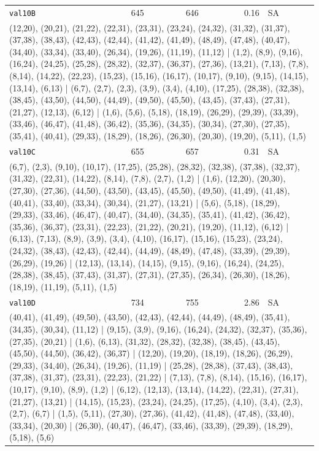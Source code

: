 \begin{longtable}{lrrrl}
\texttt{val10B} & 645 & 646 & 0.16 & SA \\
\multicolumn{5}{p{0.96\linewidth}}{\tiny\raggedright\arraybackslash (12,20), (20,21), (21,22), (22,31), (23,31), (23,24), (24,32), (31,32), (31,37), (37,38), (38,43), (42,43), (42,44), (41,42), (41,49), (48,49), (47,48), (40,47), (34,40), (33,34), (33,40), (26,34), (19,26), (11,19), (11,12) | (1,2), (8,9), (9,16), (16,24), (24,25), (25,28), (28,32), (32,37), (36,37), (27,36), (13,21), (7,13), (7,8), (8,14), (14,22), (22,23), (15,23), (15,16), (16,17), (10,17), (9,10), (9,15), (14,15), (13,14), (6,13) | (6,7), (2,7), (2,3), (3,9), (3,4), (4,10), (17,25), (28,38), (32,38), (38,45), (43,50), (44,50), (44,49), (49,50), (45,50), (43,45), (37,43), (27,31), (21,27), (12,13), (6,12) | (1,6), (5,6), (5,18), (18,19), (26,29), (29,39), (33,39), (33,46), (46,47), (41,48), (36,42), (35,36), (34,35), (30,34), (27,30), (27,35), (35,41), (40,41), (29,33), (18,29), (18,26), (26,30), (20,30), (19,20), (5,11), (1,5)} \\[2pt]
\texttt{val10C} & 655 & 657 & 0.31 & SA \\
\multicolumn{5}{p{0.96\linewidth}}{\tiny\raggedright\arraybackslash (6,7), (2,3), (9,10), (10,17), (17,25), (25,28), (28,32), (32,38), (37,38), (32,37), (31,32), (22,31), (14,22), (8,14), (7,8), (2,7), (1,2) | (1,6), (12,20), (20,30), (27,30), (27,36), (44,50), (43,50), (43,45), (45,50), (49,50), (41,49), (41,48), (40,41), (33,40), (33,34), (30,34), (21,27), (13,21) | (5,6), (5,18), (18,29), (29,33), (33,46), (46,47), (40,47), (34,40), (34,35), (35,41), (41,42), (36,42), (35,36), (36,37), (23,31), (22,23), (21,22), (20,21), (19,20), (11,12), (6,12) | (6,13), (7,13), (8,9), (3,9), (3,4), (4,10), (16,17), (15,16), (15,23), (23,24), (24,32), (38,43), (42,43), (42,44), (44,49), (48,49), (47,48), (33,39), (29,39), (26,29), (19,26) | (12,13), (13,14), (14,15), (9,15), (9,16), (16,24), (24,25), (28,38), (38,45), (37,43), (31,37), (27,31), (27,35), (26,34), (26,30), (18,26), (18,19), (11,19), (5,11), (1,5)} \\[2pt]
\texttt{val10D} & 734 & 755 & 2.86 & SA \\
\multicolumn{5}{p{0.96\linewidth}}{\tiny\raggedright\arraybackslash (40,41), (41,49), (49,50), (43,50), (42,43), (42,44), (44,49), (48,49), (35,41), (34,35), (30,34), (11,12) | (9,15), (3,9), (9,16), (16,24), (24,32), (32,37), (35,36), (27,35), (20,21) | (1,6), (6,13), (31,32), (28,32), (32,38), (38,45), (43,45), (45,50), (44,50), (36,42), (36,37) | (12,20), (19,20), (18,19), (18,26), (26,29), (29,33), (34,40), (26,34), (19,26), (11,19) | (25,28), (28,38), (37,43), (38,43), (37,38), (31,37), (23,31), (22,23), (21,22) | (7,13), (7,8), (8,14), (15,16), (16,17), (10,17), (9,10), (8,9), (1,2) | (6,12), (12,13), (13,14), (14,22), (22,31), (27,31), (21,27), (13,21) | (14,15), (15,23), (23,24), (24,25), (17,25), (4,10), (3,4), (2,3), (2,7), (6,7) | (1,5), (5,11), (27,30), (27,36), (41,42), (41,48), (47,48), (33,40), (33,34), (20,30) | (26,30), (40,47), (46,47), (33,46), (33,39), (29,39), (18,29), (5,18), (5,6)} \\[2pt]

\end{longtable}
